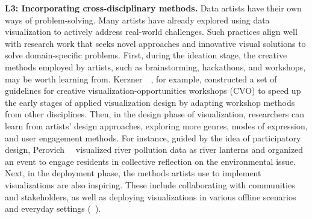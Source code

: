 \textbf{L3: Incorporating cross-disciplinary methods.}
Data artists have their own ways of problem-solving. Many artists have already explored using data visualization to actively address real-world challenges. Such practices align well with research work that seeks novel approaches and innovative visual solutions to solve domain-specific problems.
First, during the ideation stage, the creative methods employed by artists, such as brainstorming, hackathons, and workshops, may be worth learning from. Kerzner~\etal~\cite{kerzner2018framework}, for example, constructed a set of guidelines for creative visualization-opportunities workshops (CVO) to speed up the early stages of applied visualization design by adapting workshop methods from other disciplines.
Then, in the design phase of visualization, researchers can learn from artists' design approaches, exploring more genres, modes of expression, and user engagement methods. For instance, guided by the idea of participatory design, Perovich~\etal~\cite{perovich2020chemicals} visualized river pollution data as river lanterns and organized an event to engage residents in collective reflection on the environmental issue.
Next, in the deployment phase, the methods artists use to implement visualizations are also inspiring. These include collaborating with communities and stakeholders, as well as deploying visualizations in various offline scenarios and everyday settings (\eg ~\cite{rodgers2011exploring,offenhuber2019data}).
